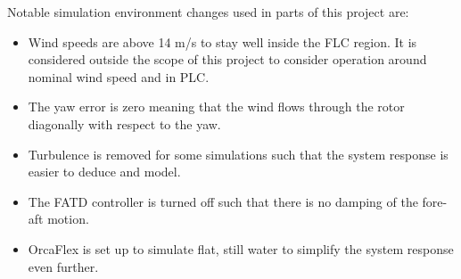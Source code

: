 Notable simulation environment changes used in parts of this project are:
\begin{itemize}
	\item Wind speeds are above 14 m/s to stay well inside the FLC region. It is considered outside the scope of this project to consider operation around nominal wind speed and in PLC.
	\item The yaw error is zero meaning that the wind flows through the rotor diagonally with respect to the yaw.
	\item Turbulence is removed for some simulations such that the system response is easier to deduce and model. 
	\item The FATD controller is turned off such that there is no damping of the fore-aft motion.
	\item OrcaFlex is set up to simulate flat, still water to simplify the system response even further. 
\end{itemize}

